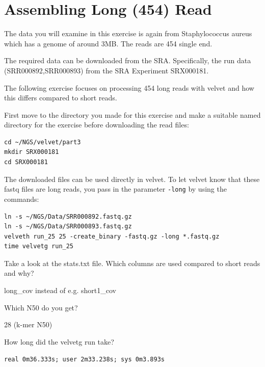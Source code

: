 \section{Assembling Long (454) Read}

\begin{note}
The data you will examine in this exercise is again from Staphylococcus aureus
which has a genome of around 3MB. The reads are 454 single end.

The required data can be downloaded from the SRA. Specifically, the run data
(SRR000892,SRR000893) from the SRA Experiment SRX000181.

\end{note}

\begin{information}
The following exercise focuses on processing 454 long reads with velvet and how
this differs compared to short reads.
\end{information}

\begin{steps}
First move to the directory you made for this exercise and make a suitable named
directory for the exercise before downloading the read files:
\begin{lstlisting}
cd ~/NGS/velvet/part3
mkdir SRX000181
cd SRX000181
\end{lstlisting}

The downloaded files can be used directly in velvet. To let velvet know that
these fastq files are long reads, you pass in the parameter \texttt{-long} by
using the commands:
\begin{lstlisting}
ln -s ~/NGS/Data/SRR000892.fastq.gz
ln -s ~/NGS/Data/SRR000893.fastq.gz
velveth run_25 25 -create_binary -fastq.gz -long *.fastq.gz
time velvetg run_25
\end{lstlisting}
\end{steps}

\begin{questions}
Take a look at the stats.txt file. Which columns are used compared to short reads and why?
\begin{answer}
long\_cov instead of e.g. short1\_cov
\end{answer}

Which N50 do you get?
\begin{answer}
28 (k-mer N50)
\end{answer}

How long did the velvetg run take?
\begin{answer}
\texttt{real    0m36.333s; user    2m33.238s; sys     0m3.893s}
\end{answer}
\end{questions}

